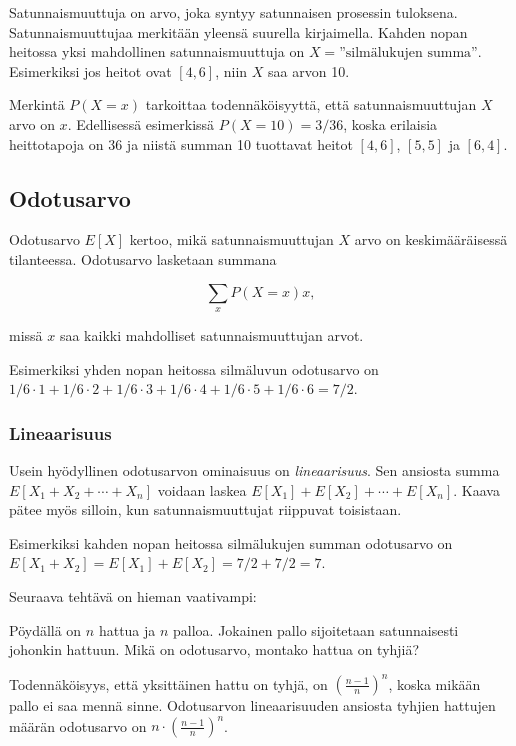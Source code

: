 Satunnaismuuttuja on arvo, joka syntyy satunnaisen
prosessin tuloksena.
Satunnaismuuttujaa merkitään yleensä
suurella kirjaimella.
Kahden nopan heitossa yksi mahdollinen
satunnaismuuttuja on $X=\textrm{''silmälukujen summa''}$.
Esimerkiksi jos heitot ovat $[4,6]$,
niin $X$ saa arvon 10.

Merkintä $P(X=x)$ tarkoittaa todennäköisyyttä,
että satunnaismuuttujan $X$ arvo on $x$.
Edellisessä esimerkissä $P(X=10)=3/36$,
koska erilaisia heittotapoja on 36
ja niistä summan 10 tuottavat heitot
$[4,6]$, $[5,5]$ ja $[6,4]$.

\subsection{Odotusarvo}

Odotusarvo $E[X]$ kertoo, mikä satunnaismuuttujan $X$
arvo on keskimääräisessä tilanteessa.
Odotusarvo lasketaan summana

\[\sum_x P(X=x)x,\]

missä $x$ saa kaikki mahdolliset satunnaismuuttujan arvot.

Esimerkiksi yhden nopan heitossa silmäluvun odotusarvo
on $1/6 \cdot 1 + 1/6 \cdot 2 + 1/6 \cdot 3 + 1/6 \cdot 4 + 1/6 \cdot 5 + 1/6 \cdot 6 = 7/2$.

\subsubsection*{Lineaarisuus}

Usein hyödyllinen odotusarvon ominaisuus on \textit{lineaarisuus}.
Sen ansiosta summa $E[X_1+X_2+\cdots+X_n]$ voidaan laskea $E[X_1]+E[X_2]+\cdots+E[X_n]$.
Kaava pätee myös silloin, kun satunnaismuuttujat riippuvat toisistaan.

Esimerkiksi kahden nopan heitossa silmälukujen summan odotusarvo on
$E[X_1+X_2]=E[X_1]+E[X_2]=7/2+7/2=7$.

Seuraava tehtävä on hieman vaativampi:

\begin{task}
Pöydällä on $n$ hattua ja $n$ palloa.
Jokainen pallo sijoitetaan satunnaisesti johonkin hattuun.
Mikä on odotusarvo, montako hattua on tyhjiä?
\end{task}

Todennäköisyys, että yksittäinen hattu on tyhjä,
on $(\frac{n-1}{n})^n$, koska mikään pallo ei saa mennä sinne.
Odotusarvon lineaarisuuden ansiosta tyhjien hattujen
määrän odotusarvo on $n \cdot (\frac{n-1}{n})^n$.

